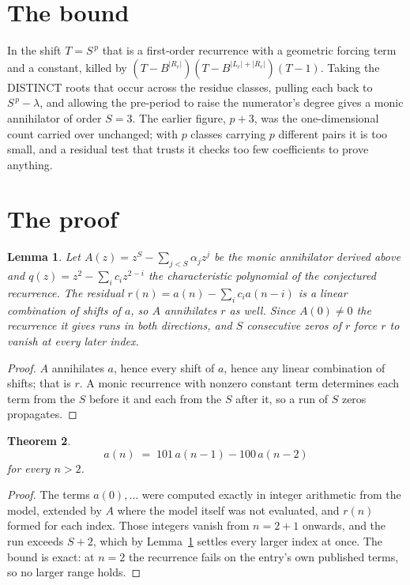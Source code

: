 \documentclass[11pt,a4paper]{article}
\theoremstyle{plain}
\newtheorem{theorem}{Theorem}
\newtheorem{lemma}[theorem]{Lemma}
\theoremstyle{definition}
\begin{document}
\section{The bound}

In the shift $T=S^{\,p}$ that is a first-order recurrence with a geometric forcing term and a
constant, killed by $(T-B^{|R_r|})(T-B^{|L_r|+|R_r|})(T-1)$. Taking the DISTINCT roots that
occur across the residue classes, pulling each back to $S^{\,p}-\lambda$, and allowing the
pre-period to raise the numerator's degree gives a monic annihilator of order $S=3$. The
earlier figure, $p+3$, was the one-dimensional count carried over unchanged; with $p$ classes
carrying $p$ different pairs it is too small, and a residual test that trusts it checks too few
coefficients to prove anything.

\section{The proof}

\begin{lemma}\label{lem:crit}
Let $A(z)=z^S-\sum_{j<S}\alpha_jz^{j}$ be the monic annihilator derived above and
$q(z)=z^{2}-\sum_ic_iz^{2-i}$ the characteristic polynomial of the conjectured
recurrence. The residual $r(n)=a(n)-\sum_ic_ia(n-i)$ is a linear combination of shifts of $a$,
so $A$ annihilates $r$ as well. Since $A(0)\ne0$ the recurrence it gives runs in both
directions, and $S$ consecutive zeros of $r$ force $r$ to vanish at every later index.
\end{lemma}

\begin{proof}
$A$ annihilates $a$, hence every shift of $a$, hence any linear combination of shifts; that is
$r$. A monic recurrence with nonzero constant term determines each term from the $S$ before it
and each from the $S$ after it, so a run of $S$ zeros propagates.
\end{proof}

\begin{theorem}
\[
a(n)\;=\;101\,a(n-1) - 100\,a(n-2)
\]
for every $n>2$.
\end{theorem}

\begin{proof}
The terms $a(0),\dots$ were computed exactly in integer arithmetic from the model, extended by
$A$ where the model itself was not evaluated, and $r(n)$ formed for each index. Those integers
vanish from $n=2+1$ onwards, and the run exceeds $S+2$, which by
Lemma~\ref{lem:crit} settles every larger index at once. The bound is exact: at $n=2$ the recurrence fails on the entry's own published terms, so no larger range holds.
\end{proof}
\end{document}
